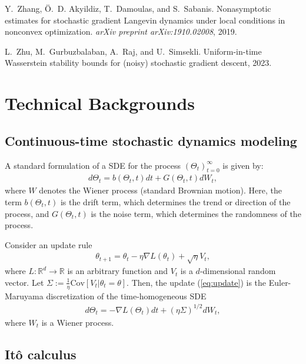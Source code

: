 \documentclass{article}
\begin{document}
\begin{thebibliography}{47}
Y.~Zhang, Ö.~D. Akyildiz, T.~Damoulas, and S.~Sabanis.
\newblock Nonasymptotic estimates for stochastic gradient {L}angevin dynamics under local conditions in nonconvex optimization.
\newblock \emph{arXiv preprint arXiv:1910.02008}, 2019.

L.~Zhu, M.~Gurbuzbalaban, A.~Raj, and U.~Simsekli.
\newblock Uniform-in-time {W}asserstein stability bounds for (noisy) stochastic gradient descent, 2023.

\end{thebibliography}

 
\onecolumn
{}

\section{Technical Backgrounds}
\subsection{Continuous-time stochastic dynamics modeling}\label{appendix:sde}
A standard formulation of a SDE for the process $(\Theta_t)_{t=0}^\infty$ is given by:
\begin{align*}
	d\Theta_t = b(\Theta_t, t)dt + G(\Theta_t, t) dW_t,
\end{align*}
where $W$ denotes the Wiener process (standard Brownian motion). Here, the term $b(\Theta_t, t)$ is the drift term, which determines the trend or direction of the process, and $G(\Theta_t, t)$ is the noise term, which determines the randomness of the process.

Consider an update rule
\begin{align}\label{eq:update}
	\theta_{t+1} = \theta_t - \eta \nabla L(\theta_t) + \sqrt{\eta} V_t,
\end{align}
where $L: \mathbb{R}^d \rightarrow \mathbb{R}$ is an arbitrary function and $V_t$ is a $d$-dimensional random vector. Let $\Sigma := \frac{1}{\eta} \mathrm{Cov}\left[V_t | \theta_t = \theta \right]$.
Then, the update (\ref{eq:update}) is the Euler-Maruyama discretization of the time-homogeneous SDE
\begin{align*}
	d\Theta_t = - \nabla L(\Theta_t)dt + (\eta \Sigma)^{1/2} dW_t,
\end{align*}
where $W_t$ is a Wiener process.

\subsection{It\^o calculus}
\end{document}
